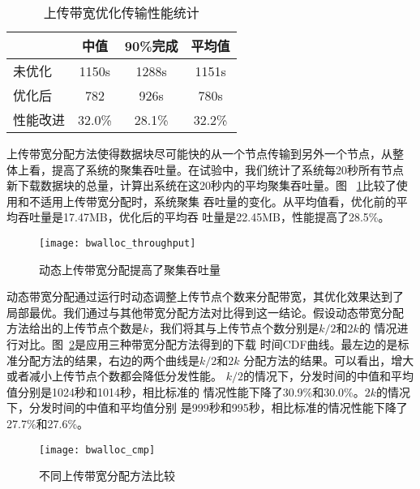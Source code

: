 \begin{table}[htbp]
\centering
\begin{minipage}{0.8\linewidth}
\centering
\caption{上传带宽优化传输性能统计}
\label{tbl:bwalloc}
\begin{tabular}{lccc}

\toprule[1.5pt]
              & 中值 & 90\%完成 & 平均值\\
\midrule[1pt]
未优化    & 1150s & 1288s & 1151s\\
优化后    & 782   & 926s  & 780s\\
性能改进  & 32.0\% & 28.1\% & 32.2\%\\
\bottomrule[1.5pt]
\end{tabular}
\end{minipage}
\end{table}



上传带宽分配方法使得数据块尽可能快的从一个节点传输到另外一个节点，从整
体上看，提高了系统的聚集吞吐量。在试验中，我们统计了系统每20秒所有节点
新下载数据块的总量，计算出系统在这20秒内的平均聚集吞吐量。图~
\ref{fig:bwalloc_throughput}比较了使用和不适用上传带宽分配时，系统聚集
吞吐量的变化。从平均值看，优化前的平均吞吐量是17.47MB，优化后的平均吞
吐量是22.45MB，性能提高了28.5\%。

\begin{figure}[htbp]
  \centering
  \begin{minipage}{0.6\linewidth}
    \centering
    \texttt{[image: bwalloc\_throughput]}
    \caption{动态上传带宽分配提高了聚集吞吐量}
    \label{fig:bwalloc_throughput}
  \end{minipage}
\end{figure}


动态带宽分配通过运行时动态调整上传节点个数来分配带宽，其优化效果达到了
局部最优。我们通过与其他带宽分配方法对比得到这一结论。假设动态带宽分配
方法给出的上传节点个数是$k$，我们将其与上传节点个数分别是$k/2$和$2k$的
情况进行对比。图~\ref{fig:bwalloc_cmp}是应用三种带宽分配方法得到的下载
时间CDF曲线。最左边的是标准分配方法的结果，右边的两个曲线是$k/2$和$2k$
分配方法的结果。可以看出，增大或者减小上传节点个数都会降低分发性能。
$k/2$的情况下，分发时间的中值和平均值分别是1024秒和1014秒，相比标准的
情况性能下降了30.9\%和30.0\%。$2k$的情况下，分发时间的中值和平均值分别
是999秒和995秒，相比标准的情况性能下降了27.7\%和27.6\%。

\begin{figure}[htbp]
  \centering
  \begin{minipage}{0.6\linewidth}
    \centering
    \texttt{[image: bwalloc\_cmp]}
    \caption{不同上传带宽分配方法比较}
    \label{fig:bwalloc_cmp}
  \end{minipage}
\end{figure}

